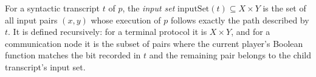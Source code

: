 \begin{definition}
\label{CommunicationComplexity.Deterministic.Protocol.Transcript.inputSet}
\leanok
{}
For a syntactic transcript $t$ of $p$, the \emph{input set} $\mathrm{inputSet}(t)
\subseteq X \times Y$ is the set of all input pairs $(x, y)$ whose execution of $p$
follows exactly the path described by $t$.  It is defined recursively: for a terminal
protocol it is $X \times Y$, and for a communication node it is the subset of pairs
where the current player's Boolean function matches the bit recorded in $t$ and the
remaining pair belongs to the child transcript's input set.
\end{definition}

